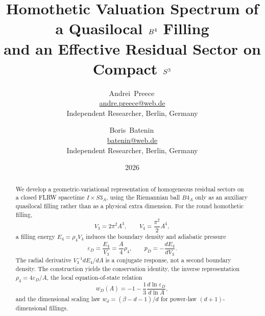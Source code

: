 \documentclass[11pt,a4paper]{article}
\title{Homothetic Valuation Spectrum of a Quasilocal \(\Bfour\) Filling\\
       and an Effective Residual Sector on Compact \(\Sthree\)}
\author{Andrei~Preece\,\orcidlink{0009-0004-5978-795X}\\
        \small \href{mailto:andre.preece@web.de}{andre.preece@web.de}\\
        \small Independent Researcher, Berlin, Germany
        \and
        Boris~Batenin\,\orcidlink{0009-0000-7027-8583}\\
        \small \href{mailto:batenin@web.de}{batenin@web.de}\\
        \small Independent Researcher, Berlin, Germany}
\date{2026}
\def\Bfour{B4}%
\def\Sthree{S3}%
\def\dd{d}%
\numberwithin{equation}{section}
\theoremstyle{remark}
\newcommand{\Sthree}{S^3}
\newcommand{\Bfour}{B^4}
\newcommand{\Efour}{E_4}
\newcommand{\rhoFour}{\rho_4}
\newcommand{\epsD}{\varepsilon_D}
\newcommand{\pD}{p_D}
\newcommand{\dd}{\mathrm{d}}
\begin{document}
\maketitle


\begin{abstract}
We develop a geometric-variational representation of homogeneous residual sectors on a closed FLRW spacetime \(I\times \Sthree_A\), using the Riemannian ball \(\Bfour_A\) only as an auxiliary quasilocal filling rather than as a physical extra dimension. For the round homothetic filling,
\begin{equation*}
V_3=2\pi^2A^3,
\qquad
V_4=\frac{\pi^2}{2}A^4,
\end{equation*}
a filling energy \(\Efour=\rhoFour V_4\) induces the boundary density and adiabatic pressure
\begin{equation*}
\epsD=\frac{\Efour}{V_3}=\frac A4\rhoFour,
\qquad
\pD=-\frac{\dd\Efour}{\dd V_3}.
\end{equation*}
The radial derivative \(V_3^{-1}\dd\Efour/\dd A\) is a conjugate response, not a second boundary density. The construction yields the conservation identity, the inverse representation \(\rhoFour=4\epsD/A\), the local equation-of-state relation
\begin{equation*}
w_D(A)=-1-\frac13\frac{\dd\ln\epsD}{\dd\ln A},
\end{equation*}
and the dimensional scaling law \(w_d=(\beta-d-1)/d\) for power-law \((d+1)\)-dimensional fillings.


\end{abstract}
\end{document}
